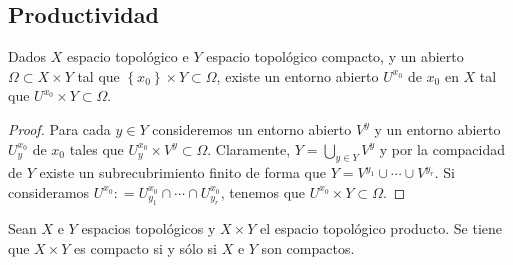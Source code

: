 \subsection*{Productividad}
\begin{lema}
	Dados $\displaystyle X $ espacio topológico e $\displaystyle Y $ espacio topológico compacto, y un abierto $\displaystyle \Omega \subset X \times Y $ tal que $\displaystyle \left\{ x_{0}\right\} \times Y \subset \Omega$, existe un entorno abierto $\displaystyle U^{x_{0}} $ de $\displaystyle x_{0} $ en $\displaystyle X $ tal que $\displaystyle U^{x_{0}}\times Y\subset \Omega  $.
\end{lema}
\begin{proof}
Para cada $\displaystyle y \in Y $ consideremos un entorno abierto $\displaystyle V^{y} $ y un entorno abierto $\displaystyle U^{x_{0}}_{y} $ de $\displaystyle x_{0} $ tales que $\displaystyle U^{x_{0}}_{y}\times V^{y}\subset \Omega  $. Claramente, $\displaystyle Y = \bigcup_{y \in Y}V^{y} $ y por la compacidad de $\displaystyle Y $ existe un subrecubrimiento finito de forma que $\displaystyle Y = V^{y_{1}} \cup \cdots \cup V^{y_{r}} $. 
Si consideramos $\displaystyle U^{x_{0}}: = U^{x_{0}}_{y_{1}} \cap \cdots \cap U^{x_{0}}_{y_{r}} $, tenemos que $\displaystyle U^{x_{0}}\times Y \subset \Omega  $.  
\end{proof}
\begin{theorem}
Sean $\displaystyle X $ e $\displaystyle Y $ espacios topológicos y $\displaystyle X \times Y $ el espacio topológico producto. Se tiene que $\displaystyle X \times Y $ es compacto si y sólo si $\displaystyle X $ e $\displaystyle Y $ son compactos.
\end{theorem}

